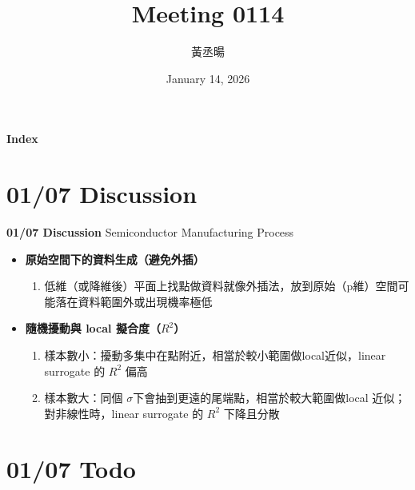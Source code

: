 \documentclass[12pt,aspectratio=43]{beamer}
\title{Meeting 0114}
\author{黃丞暘}
\institute{國立東華大學應數統計所}
\date{January 14, 2026}
\begin{document}
\begin{frame}
  \titlepage
\end{frame}

\begin{frame}{\textbf{Index}}
  \tableofcontents
\end{frame}

\section{01/07 Discussion}

\begin{frame}{\textbf{01/07 Discussion}}
\linespread{1.5}
Semiconductor Manufacturing Process

  \begin{itemize}
    \item \textbf{原始空間下的資料生成（避免外插）}
    \begin{enumerate}[]
      \item 低維（或降維後）平面上找點做資料就像外插法，放到原始（p維）空間可能落在資料範圍外或出現機率極低
    \end{enumerate}
    \item \textbf{隨機擾動與 local 擬合度（$R^2$）}
    \begin{enumerate}[]
      \item 樣本數小：擾動多集中在點附近，相當於較小範圍做local近似，linear surrogate 的 $R^2$ 偏高
      \item 樣本數大：同個 $\sigma$下會抽到更遠的尾端點，相當於較大範圍做local 近似；對非線性時，linear surrogate 的 $R^2$ 下降且分散
    \end{enumerate}
  \end{itemize}
\end{frame}


\section{01/07 Todo}
\end{document}
